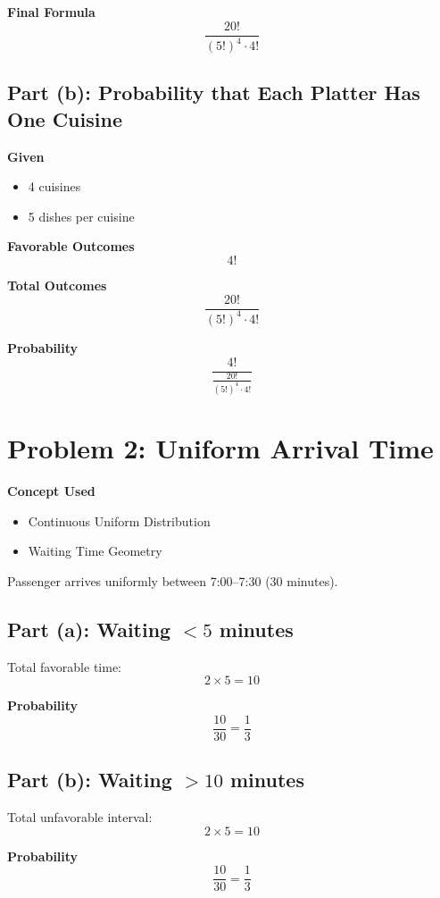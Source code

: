 \documentclass[11pt]{article}
\begin{document}
\textbf{Final Formula}
\[
\boxed{
\frac{20!}{(5!)^4 \cdot 4!}
}
\]

\subsection*{Part (b): Probability that Each Platter Has One Cuisine}

\textbf{Given}
\begin{itemize}
    \item 4 cuisines
    \item 5 dishes per cuisine
\end{itemize}

\textbf{Favorable Outcomes}
\[
4!
\]

\textbf{Total Outcomes}
\[
\frac{20!}{(5!)^4 \cdot 4!}
\]

\textbf{Probability}
\[
\boxed{
\frac{4!}{\frac{20!}{(5!)^4 \cdot 4!}}
}
\]

\newpage

\section*{Problem 2: Uniform Arrival Time}

\textbf{Concept Used}
\begin{itemize}
    \item Continuous Uniform Distribution
    \item Waiting Time Geometry
\end{itemize}

Passenger arrives uniformly between 7:00–7:30 (30 minutes).

\subsection*{Part (a): Waiting $<5$ minutes}

Total favorable time:
\[
2 \times 5 = 10
\]

\textbf{Probability}
\[
\boxed{
\frac{10}{30} = \frac{1}{3}
}
\]

\subsection*{Part (b): Waiting $>10$ minutes}

Total unfavorable interval:
\[
2 \times 5 = 10
\]

\textbf{Probability}
\[
\boxed{
\frac{10}{30} = \frac{1}{3}
}
\]

\newpage
\end{document}
